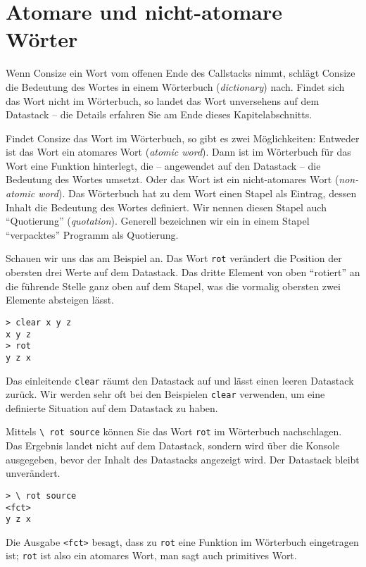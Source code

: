 \section{Atomare und nicht-atomare Wörter}
\label{Sec:AtomareWoerter}

Wenn Consize ein Wort vom offenen Ende des Callstacks nimmt, schlägt Consize die Bedeutung des Wortes in einem Wör\-ter\-buch (\emph{dictionary}) nach. Findet sich das Wort nicht im Wörterbuch, so landet das Wort unversehens auf dem Datastack -- die Details erfahren Sie am Ende dieses Kapitelabschnitts.

Findet Consize das Wort im Wörterbuch, so gibt es zwei Möglichkeiten: Entweder ist das Wort ein atomares Wort (\emph{atomic word}). Dann ist im Wörterbuch für das Wort eine Funktion hinterlegt, die -- angewendet auf den Datastack -- die Bedeutung des Wortes umsetzt. Oder das Wort ist ein nicht-atomares Wort (\emph{non-atomic word}). Das Wörterbuch hat zu dem Wort einen Stapel als Eintrag, dessen Inhalt die Bedeutung des Wortes definiert. Wir nennen diesen Stapel auch "`Quotierung"' (\emph{quotation}). Generell bezeichnen wir ein in einem Stapel "`verpacktes"' Programm als Quotierung.

Schauen wir uns das am Beispiel an. Das Wort \verb|rot| verändert die Position der obersten drei Werte auf dem Datastack. Das dritte Element von oben "`rotiert"' an die führende Stelle ganz oben auf dem Stapel, was die vormalig obersten zwei Elemente absteigen lässt.

\begin{verbatim}
> clear x y z
x y z
> rot
y z x
\end{verbatim}

Das einleitende \verb|clear| räumt den Datastack auf und lässt einen leeren Datastack zurück. Wir werden sehr oft bei den Beispielen \verb|clear| verwenden, um eine definierte Situation auf dem Datastack zu haben.

\label{rotsource}Mittels \verb|\ rot source| können Sie das Wort \verb|rot| im Wörterbuch nachschlagen. Das Ergebnis landet nicht auf dem Datastack, sondern wird über die Konsole ausgegeben, bevor der Inhalt des Datastacks angezeigt wird. Der Datastack bleibt unverändert.

\begin{verbatim}
> \ rot source
<fct>
y z x
\end{verbatim}

Die Ausgabe \verb|<fct>| besagt, dass zu \verb|rot| eine Funktion im Wörterbuch eingetragen ist; \verb|rot| ist also ein atomares Wort, man sagt auch primitives Wort.

